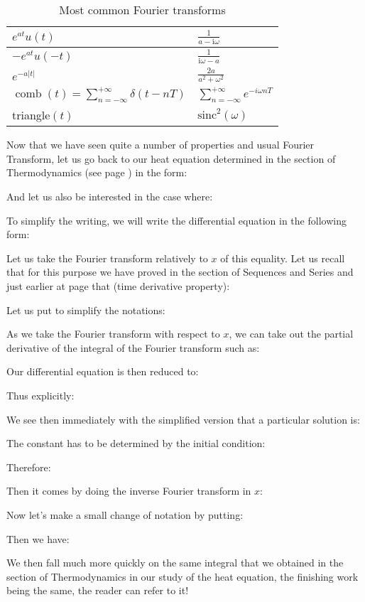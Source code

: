 \begin{table}[H]
\begin{tabular}{|l|l|}
		$e^{a t} u(t)$ & $\displaystyle\frac{1}{a-\mathrm{i} \omega}$ \\ \hline
		$-e^{a t} u(-t)$ & $\displaystyle\frac{1}{\mathrm{i} \omega-a}$ \\ \hline
		$e^{-a|t|}$ & $\displaystyle\frac{2 a}{a^2+\omega^2}$ \\ \hline
		$\displaystyle\operatorname{comb}(t)=\sum_{n=-\infty}^{+\infty} \delta(t-n T)$ & $\displaystyle\sum_{n=-\infty}^{+\infty} e^{-i \omega n T}$ \\ \hline
		triangle$(t)$ & $\text{sinc}^2(\omega)$ \\ \hline
		\end{tabular}
		\caption{Most common Fourier transforms}
	\end{table}
	
	Now that we have seen quite a number of properties and usual Fourier Transform, let us go back to our heat equation determined in the section of Thermodynamics (see page \pageref{heat equation}) in the form:
	
	And let us also be interested in the case where:
	
	To simplify the writing, we will write the differential equation in the following form:
	
	Let us take the Fourier transform relatively to $x$ of this equality. Let us recall that for this purpose we have proved in the section of Sequences and Series and just earlier at page \pageref{fourier transform time derivative} that (time derivative property):
	
	Let us put to simplify the notations:
	
	As we take the Fourier transform with respect to $x$, we can take out the partial derivative of the integral of the Fourier transform such as:
	
	Our differential equation is then reduced to:
	
	Thus explicitly:
	
	We see then immediately with the simplified version that a particular solution is:
	
	The constant has to be determined by the initial condition:
	
	Therefore:
	
	Then it comes by doing the inverse Fourier transform in $x$:
	
	Now let's make a small change of notation by putting:
	
	Then we have:
	
	We then fall much more quickly on the same integral that we obtained in the section of Thermodynamics in our study of the heat equation, the finishing work being the same, the reader can refer to it!

